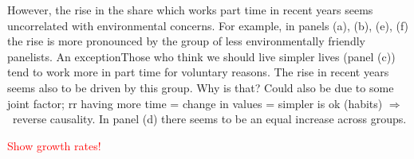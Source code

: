 \documentclass[12pt]{article}
\newcommand{\ar}{$\Rightarrow$ \ }
\newcommand{\tr}[1]{\textcolor{red}{#1}}
\begin{document}
However, the rise in the share which works part time in recent years seems uncorrelated with environmental concerns. 
For example, in panels (a), (b), (e), (f) the rise is more pronounced by the group of less environmentally friendly panelists. An exceptionThose who think we should live simpler lives (panel (c)) tend to work more in part time for voluntary reasons. The rise in recent years seems also to be driven by this group. Why is that? Could also be due to some joint factor; rr having more time = change in values = simpler is ok (habits) \ar reverse causality. In panel (d) there seems to be an equal increase across groups. 

\tr{Show growth rates!}

\clearpage

\end{document}
